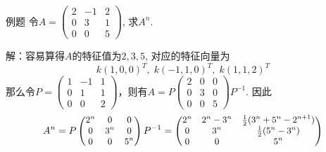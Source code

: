 \documentclass[10pt]{beamer}
\begin{document}
\begin{frame}

\begin{block}{例题}
令$A = \begin{pmatrix} 2 & -1 & 2 \\ 0 & 3 & 1 \\ 0 & 0 & 5 \end{pmatrix}$, 求$A^{n}$.

\vspace{1em}
\pause

解：容易算得$A$的特征值为$2, 3, 5$, 对应的特征向量为$$k(1,0,0)^T, \; k(-1,1,0)^T, \; k(1,1,2)^T$$
那么令$P=\begin{pmatrix} 1 & -1 & 1 \\ 0 & 1 & 1 \\ 0 & 0 & 2 \end{pmatrix}$，则有$A = P \begin{pmatrix} 2 & 0 & 0 \\ 0 & 3 & 0 \\ 0 & 0 & 5 \end{pmatrix} P^{-1}$.
因此
\begin{equation*}
\small
A^{n} = P \begin{pmatrix} 2^{n} & 0 & 0 \\ 0 & 3^{n} & 0 \\ 0 & 0 & 5^{n} \end{pmatrix} P^{-1} = \begin{pmatrix} 2^{n} & 2^n-3^n & \frac{1}{2}(3^n+5^n-2^{n+1}) \\ 0 & 3^n & \frac{1}{2}(5^n-3^n) \\ 0 & 0 & 5^n \end{pmatrix}
\end{equation*}
\end{block}

\end{frame}



\end{document}

